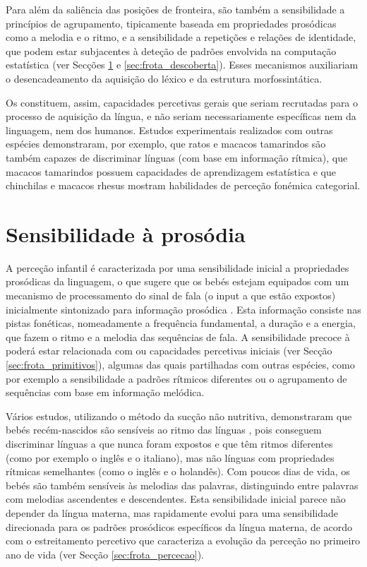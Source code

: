 \documentclass[output=paper]{LSP/langsci}
\begin{document}
Para além da saliência das posições de fronteira, são também  a sensibilidade a princípios de agrupamento, tipicamente baseada em propriedades prosódicas como a melodia e o ritmo, e a sensibilidade a repetições e relações de identidade, que podem estar subjacentes à deteção de padrões envolvida na computação estatística (ver Secções \ref{sec:frota_sensibilidade} e \ref{sec:frota_descoberta}). Esses mecanismos auxiliariam o desencadeamento da aquisição do léxico e da estrutura morfossintática. 

Os  constituem, assim, capacidades percetivas gerais que seriam recrutadas para o processo de aquisição da língua, e não seriam necessariamente específicas nem da linguagem, nem dos humanos. Estudos experimentais realizados com outras espécies demonstraram, por exemplo, que ratos e macacos tamarindos são também capazes de discriminar línguas (com base em informação rítmica), que macacos tamarindos possuem capacidades de aprendizagem estatística e que chinchilas e macacos rhesus mostram habilidades de perceção fonémica categorial. 

\section{Sensibilidade à prosódia}
\label{sec:frota_sensibilidade}
A perceção infantil é caracterizada por uma sensibilidade inicial a propriedades prosódicas da linguagem, o que sugere que os bebés estejam equipados com um mecanismo de processamento do sinal de fala (o input a que estão expostos) inicialmente sintonizado para informação prosódica \citep{morgandemuth1996,jusczyk1997}. Esta informação consiste nas pistas fonéticas, nomeadamente a frequência fundamental, a duração e a energia, que fazem o ritmo e a melodia das sequências de fala. A sensibilidade precoce à  poderá estar relacionada com  ou capacidades percetivas iniciais (ver Secção \ref{sec:frota_primitivos}), algumas das quais partilhadas com outras espécies, como por exemplo a sensibilidade a padrões rítmicos diferentes ou o agrupamento de sequências com base em informação melódica.

Vários estudos, utilizando o método da sucção não nutritiva, demonstraram que bebés recém-nascidos são sensíveis ao ritmo das línguas \citep{nazzi_etal1998,gervainmehler2010}, pois conseguem discriminar línguas a que nunca foram expostos e que têm ritmos diferentes (como por exemplo o inglês e o italiano), mas não línguas com propriedades rítmicas semelhantes (como o inglês e o holandês). Com poucos dias de vida, os bebés são também sensíveis às melodias das palavras, distinguindo entre palavras com melodias ascendentes e descendentes. Esta sensibilidade inicial parece não depender da língua materna, mas rapidamente evolui para uma sensibilidade direcionada para os padrões prosódicos específicos da língua materna, de acordo com o estreitamento percetivo que caracteriza a evolução da perceção no primeiro ano de vida (ver Secção \ref{sec:frota_percecao}).
\end{document}
